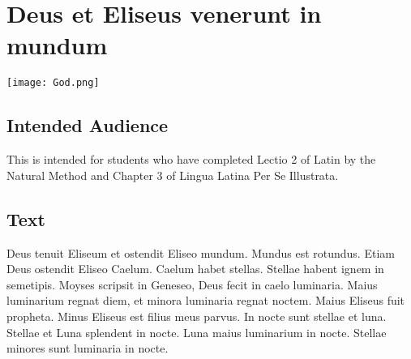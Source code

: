 \chapter{Deus et Eliseus venerunt in mundum}
\begin{center}
\texttt{[image: God.png]}
\end{center}

\section{Intended Audience}
This is intended for students who have completed Lectio 2 of Latin by the Natural Method and Chapter 3 of Lingua Latina Per Se Illustrata.

\section{Text}
Deus tenuit Eliseum et ostendit Eliseo mundum. Mundus est rotundus. Etiam Deus ostendit Eliseo Caelum. Caelum habet stellas. Stellae habent ignem in semetipis.  Moyses scripsit in Geneseo, Deus fecit in caelo luminaria. Maius luminarium regnat diem, et minora luminaria regnat noctem. Maius Eliseus fuit propheta. Minus Eliseus est filius meus parvus. In nocte sunt stellae et luna. Stellae et Luna splendent in nocte. Luna maius luminarium in nocte. Stellae minores sunt luminaria in nocte. 